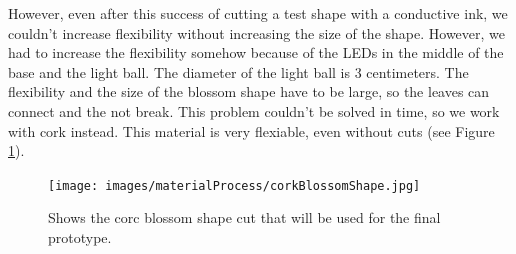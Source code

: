 \documentclass[04.3_buildingProcess.tex]{subfiles}
\begin{document}
    \noindent
    However, even after this success of cutting a test shape with a conductive ink, we couldn't 
    increase flexibility without increasing the size of the shape. However, we had to increase 
    the flexibility somehow because of the LEDs in the middle of the base and the light ball. 
    The diameter of the light ball is 3 centimeters. The flexibility and the size of the blossom 
    shape have to be large, so the leaves can connect and the not break. This problem couldn't 
    be solved in time, so we work with cork instead. This material is very flexiable, even 
    without cuts (see Figure \ref{fig:corkTest}).\\

    \begin{figure}[H]
        \centering
            \texttt{[image: images/materialProcess/corkBlossomShape.jpg]}
            \caption{Shows the corc blossom shape cut that will be used for the final prototype.}
            \label{fig:corkTest}
    \end{figure}
\end{document}
